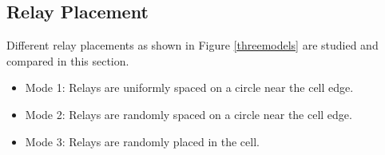 \subsection{Relay Placement}
Different relay placements as shown in Figure \ref{threemodels} are studied and compared in this section.
\begin{itemize}
\item Mode 1: Relays are uniformly spaced on a circle near the cell edge.
    \item Mode 2: Relays are randomly spaced on a circle near the cell edge.
    \item Mode 3: Relays are randomly placed in the cell.
    \end{itemize}
